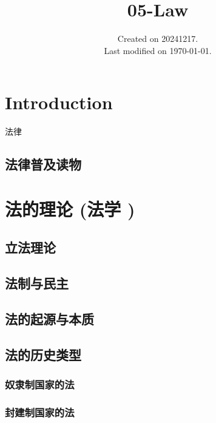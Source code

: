 \documentclass[UTF8]{../ApplicationUniverse}
\begin{document}
\title{05-Law}
\date{Created on 20241217.\\   Last modified on \today.}
\maketitle
\tableofcontents


\chapter{Introduction}
法律

\section{法律普及读物}



  
\chapter{法的理论 (法学 )}

\section{立法理论}
\section{法制与民主}
\section{法的起源与本质}
\section{法的历史类型}
    \subsection{奴隶制国家的法}
    \subsection{封建制国家的法}
\end{document}
